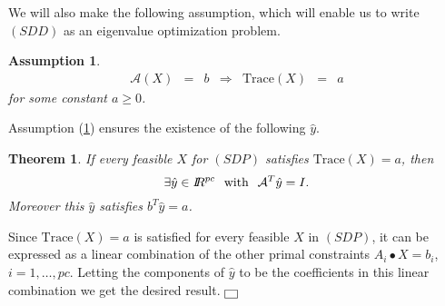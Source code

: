 \documentclass[12pt]{kluwer}
\newtheorem{theorem}{Theorem}
\newtheorem{assumption}{Assumption}
\newenvironment{proof}{{\raggedright\bf
 Proof:}\quad}{\hspace*{\fill}$\fbox{ }$\\}
\newcommand{\real}{I\!\! R}
\begin{document}
\begin{article}
We will also make the following assumption, which will enable us to write $(SDD)$ as an eigenvalue optimization problem.
\begin{assumption}
\label{constant_trace}
\begin{equation}
\begin{array}{ccccccc}
\mathcal{A} (X) & = & b & \Rightarrow & \mbox{Trace}(X) & = & a
\end{array}
\end{equation}
for some constant $a \ge 0$.
\end{assumption}
Assumption (\ref{constant_trace}) ensures the existence of the following $\hat{y}$.
\begin{theorem}
\label{constant_trace_corollary}
If every feasible $X$ for $(SDP)$ satisfies $\mbox{Trace}(X) = a$, then
\begin{displaymath}
\exists \hat{y} \in \real^{pc}  \hspace*{0.25cm} \mbox{with} \hspace*{0.25cm} \mathcal{A}^T \hat{y} = I.
\end{displaymath}
Moreover this $\hat{y}$ satisfies $b^T \hat{y} = a$.
\end{theorem}
\begin{proof}
Since $\mbox{Trace}(X) = a$ is satisfied for every feasible $X$ in $(SDP)$, it can be expressed
as a linear combination of the other primal constraints $A_i \bullet X = b_i$, $i=1,\ldots,pc$.
Letting the components of $\hat{y}$ to be the coefficients in this linear combination we get the desired result.
\end{proof}


\end{article}
\end{document}
